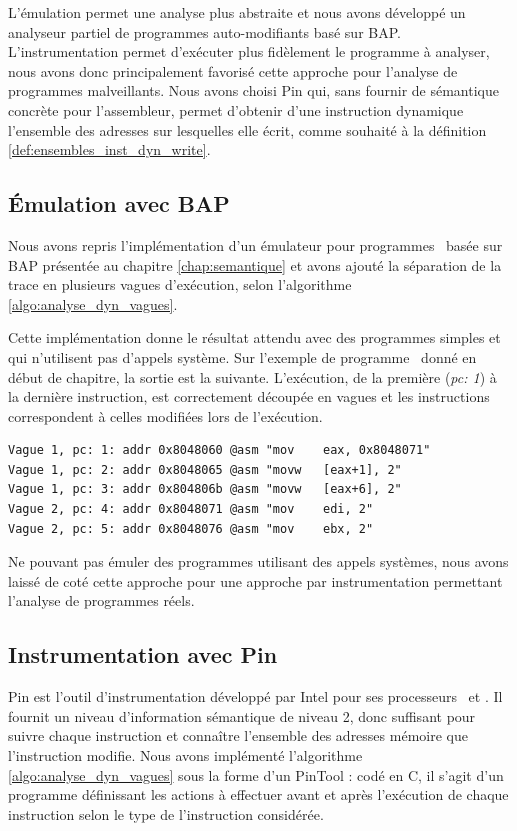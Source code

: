 L'émulation permet une analyse plus abstraite et nous avons développé un analyseur partiel de programmes auto-modifiants basé sur BAP.
L'instrumentation permet d'exécuter plus fidèlement le programme à analyser, nous avons donc principalement favorisé cette approche pour l'analyse de programmes malveillants. Nous avons choisi Pin qui, sans fournir de sémantique concrète pour l'assembleur, permet d'obtenir d'une instruction dynamique l'ensemble des adresses sur lesquelles elle écrit, comme souhaité à la définition \ref{def:ensembles_inst_dyn_write}.

\subsection{Émulation avec BAP}
Nous avons repris l'implémentation d'un émulateur pour programmes \sms\ basée sur BAP présentée au chapitre \ref{chap:semantique} et avons ajouté la séparation de la trace en plusieurs vagues d'exécution, selon l'algorithme \ref{algo:analyse_dyn_vagues}.

Cette implémentation donne le résultat attendu avec des programmes simples et qui n'utilisent pas d'appels système.
Sur l'exemple de programme \sm\ donné en début de chapitre, la sortie est la suivante.
L'exécution, de la première (\emph{pc: 1}) à la dernière instruction, est correctement découpée en vagues et les instructions correspondent à celles modifiées lors de l'exécution.

\begin{center}
\begin{verbatim}
Vague 1, pc: 1: addr 0x8048060 @asm "mov    eax, 0x8048071"
Vague 1, pc: 2: addr 0x8048065 @asm "movw   [eax+1], 2"
Vague 1, pc: 3: addr 0x804806b @asm "movw   [eax+6], 2"
Vague 2, pc: 4: addr 0x8048071 @asm "mov    edi, 2"
Vague 2, pc: 5: addr 0x8048076 @asm "mov    ebx, 2"
\end{verbatim}
\end{center}

Ne pouvant pas émuler des programmes utilisant des appels systèmes, nous avons laissé de coté cette approche pour une approche par instrumentation permettant l'analyse de programmes réels.


\subsection{Instrumentation avec Pin}
Pin est l'outil d'instrumentation développé par Intel pour ses processeurs \xq\ et \xs.
Il fournit un niveau d'information sémantique de niveau 2, donc suffisant pour suivre chaque instruction et connaître l'ensemble des adresses mémoire que l'instruction modifie.
Nous avons implémenté l'algorithme \ref{algo:analyse_dyn_vagues} sous la forme d'un PinTool : codé en C, il s'agit d'un programme définissant les actions à effectuer avant et après l'exécution de chaque instruction selon le type de l'instruction considérée.

